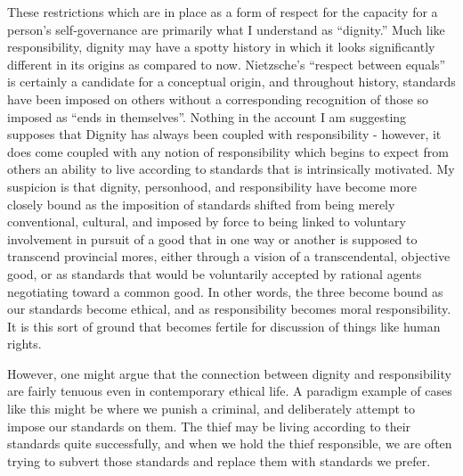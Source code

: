 \documentclass[phd,12pt,oneside,paper=letterpaper]{ubcthesis}
\begin{document}
These restrictions which are in place as a form of respect for the capacity for a person's self-governance  are primarily what I understand as ``dignity.'' Much like responsibility, dignity may have a spotty history in which it looks significantly different in its origins as compared to now. Nietzsche's ``respect between equals'' \citep[p.23]{nietzsche2010} is certainly a candidate for a conceptual origin, and throughout history, standards have been imposed on others without a corresponding recognition of those so imposed as ``ends in themselves''. Nothing in the account I am suggesting supposes that Dignity has always been coupled with responsibility - however, it does come coupled with any notion of responsibility which begins to expect from others an ability to live according to standards that is intrinsically motivated. My suspicion is that dignity, personhood, and responsibility have become more closely bound as the imposition of standards shifted from being merely conventional, cultural, and imposed by force to being linked to voluntary involvement in pursuit of a good that in one way or another is supposed to transcend provincial mores, either through a vision of a transcendental, objective good, or as standards that would be voluntarily accepted by rational agents negotiating toward a common good. In other words, the three become bound as our standards become ethical, and as responsibility becomes moral responsibility. It is this sort of ground that becomes fertile for discussion of things like human rights. 

However, one might argue that the connection between dignity and responsibility are fairly tenuous even in contemporary ethical life. A paradigm example of cases like this might be where we punish a criminal, and deliberately attempt to impose our standards on them. The thief may be living according to their standards quite successfully, and when we hold the thief responsible, we are often trying to subvert those standards and replace them with standards we prefer. 
\end{document}
